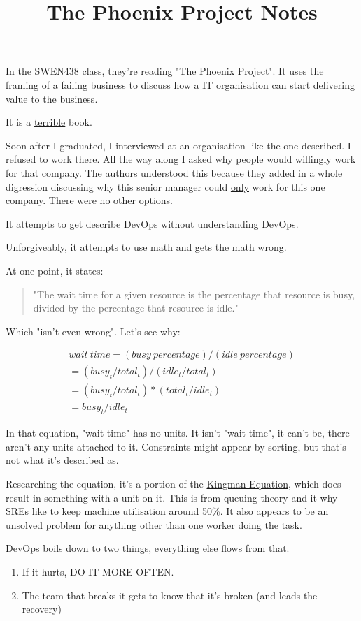 \documentclass{article}
\begin{document}
	\title{The Phoenix Project Notes}
	
In the SWEN438 class, they're reading "The Phoenix Project". It uses the framing of a failing business to discuss how a IT organisation can start delivering value to the business.

It is a \underline{terrible} book.

Soon after I graduated, I interviewed at an organisation like the one described. I refused to work there. All the way along I asked why people would willingly work for that company. The authors understood this because they added in a whole digression discussing why this senior manager could \underline{only} work for this one company. There were no other options.

It attempts to get describe DevOps without understanding DevOps.

Unforgiveably, it attempts to use math and gets the math wrong.

At one point, it states:

\begin{quote}
"The wait time for a given resource is the percentage that
resource is busy, divided by the percentage that resource is idle."
\end{quote}

Which "isn't even wrong". Let's see why:

\begin{align}
wait\ time = (busy\ percentage)/(idle\ percentage) \\
= (busy_t/total_t)/(idle_t/total_t)\\
= (busy_t/total_t) * (total_t/idle_t)\\
= busy_t/idle_t
\end{align}

In that equation, "wait time" has no units. It isn't "wait time", it can't be, there aren't any units attached to it. Constraints might appear by sorting, but that's not what it's described as.

Researching the equation, it's a portion of the \href{https://en.wikipedia.org/wiki/Kingman%27s_formula}{Kingman Equation}, which does result in something with a unit on it. This is from queuing theory and it why SREs like to keep machine utilisation around 50\%. It also appears to be an unsolved problem for anything other than one worker doing the task.

DevOps boils down to two things, everything else flows from that.

\begin{enumerate}
	\item If it hurts, DO IT MORE OFTEN.
	\item The team that breaks it gets to know that it's broken (and leads the recovery)
\end{enumerate}
\end{document}
